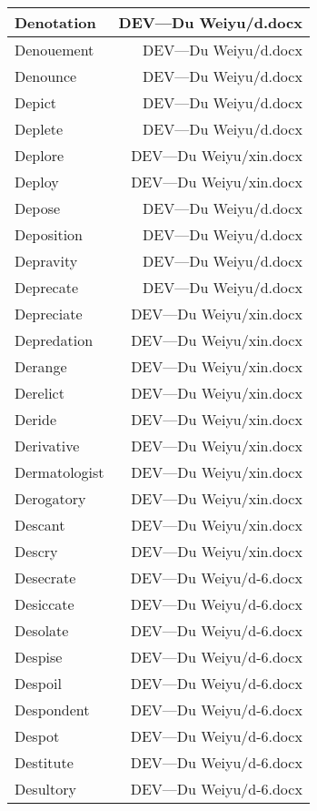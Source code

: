 \documentclass{article}
\begin{document}
\begin{center}
\begin{longtable}{|l|r|}
\hline
Denotation  &  DEV---Du Weiyu/d.docx\\  
\hline
Denouement  &  DEV---Du Weiyu/d.docx\\  
\hline
Denounce  &  DEV---Du Weiyu/d.docx\\  
\hline
Depict  &  DEV---Du Weiyu/d.docx\\  
\hline
Deplete  &  DEV---Du Weiyu/d.docx\\  
\hline
Deplore  &  DEV---Du Weiyu/xin.docx\\  
\hline
Deploy  &  DEV---Du Weiyu/xin.docx\\  
\hline
Depose  &  DEV---Du Weiyu/d.docx\\  
\hline
Deposition  &  DEV---Du Weiyu/d.docx\\  
\hline
Depravity  &  DEV---Du Weiyu/d.docx\\  
\hline
Deprecate  &  DEV---Du Weiyu/d.docx\\  
\hline
Depreciate  &  DEV---Du Weiyu/xin.docx\\  
\hline
Depredation  &  DEV---Du Weiyu/xin.docx\\  
\hline
Derange  &  DEV---Du Weiyu/xin.docx\\  
\hline
Derelict  &  DEV---Du Weiyu/xin.docx\\  
\hline
Deride  &  DEV---Du Weiyu/xin.docx\\  
\hline
Derivative  &  DEV---Du Weiyu/xin.docx\\  
\hline
Dermatologist  &  DEV---Du Weiyu/xin.docx\\  
\hline
Derogatory  &  DEV---Du Weiyu/xin.docx\\  
\hline
Descant  &  DEV---Du Weiyu/xin.docx\\  
\hline
Descry  &  DEV---Du Weiyu/xin.docx\\  
\hline
Desecrate  &  DEV---Du Weiyu/d-6.docx\\  
\hline
Desiccate  &  DEV---Du Weiyu/d-6.docx\\  
\hline
Desolate  &  DEV---Du Weiyu/d-6.docx\\  
\hline
Despise  &  DEV---Du Weiyu/d-6.docx\\  
\hline
Despoil  &  DEV---Du Weiyu/d-6.docx\\  
\hline
Despondent  &  DEV---Du Weiyu/d-6.docx\\  
\hline
Despot  &  DEV---Du Weiyu/d-6.docx\\  
\hline
Destitute  &  DEV---Du Weiyu/d-6.docx\\  
\hline
Desultory  &  DEV---Du Weiyu/d-6.docx\\  

\end{longtable}
\end{center}
\end{document}
